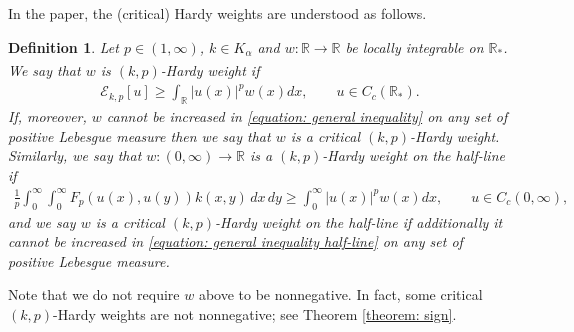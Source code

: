 \documentclass[12pt, a4paper]{amsart}
\newtheorem{definition}[theorem]{Definition}
\newcommand{\R}{\mathbb{R}}
\newcommand{\Ro}{\R_*}
\newcommand{\E}{\mathcal{E}}
\begin{document}
In the paper, the (critical) Hardy weights are understood  as follows.
\begin{definition}
Let $p \in (1, \infty)$, $k \in K_{\alpha}$ and $w : \R \xrightarrow[]{} \R$ be locally integrable on $\Ro$. We say that $w$ is $(k, p)$-Hardy weight if 
\begin{align}
\label{equation: general inequality}
    \E_{k, p}[u] \geq \int_{\R}|u(x)|^pw(x)dx,\qquad u \in C_c(\Ro).
\end{align}
If, moreover, $w$  cannot be increased in \eqref{equation: general inequality} on any set of positive Lebesgue measure 
then we say that $w$ is a critical $(k, p)$-Hardy weight. Similarly, we say that $w : (0, \infty) \rightarrow \R$ is a $(k, p)$-Hardy weight on the half-line if
\begin{align}
\label{equation: general inequality half-line}
    \frac{1}{p}\int_{0}^{\infty}\int_{0}^{\infty}F_p(u(x), u(y))k(x, y)\,dx\,dy \geq \int_{0}^{\infty}|u(x)|^pw(x)dx,\qquad u \in C_c(0, \infty),
\end{align}
and we say $w$
is a critical $(k, p)$-Hardy weight on the half-line if additionally it cannot be 
increased in \eqref{equation: general inequality half-line} on any set of positive Lebesgue measure.
\end{definition}
 Note that we do not require $w$ above to be nonnegative. In fact, some critical $(k, p)$-Hardy weights are not nonnegative; see Theorem \cref{theorem: sign}.
\end{document}
